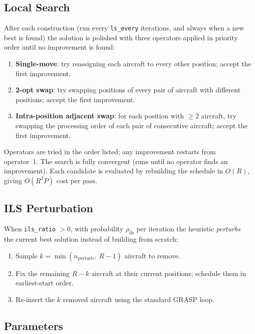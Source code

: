 \subsection{Local Search}
\label{sec:constructive-ls}

After each construction (run every \texttt{ls\_every} iterations, and always
when a new best is found) the solution is polished with three operators applied
in priority order until no improvement is found:

\begin{enumerate}[noitemsep]
    \item \textbf{Single-move}: try reassigning each aircraft to every other
          position; accept the first improvement.
    \item \textbf{2-opt swap}: try swapping positions of every pair of aircraft
          with different positions; accept the first improvement.
    \item \textbf{Intra-position adjacent swap}: for each position with
          $\geq 2$ aircraft, try swapping the processing order of each pair of
          consecutive aircraft; accept the first improvement.
\end{enumerate}

Operators are tried in the order listed; any improvement restarts from
operator~1.  The search is fully convergent (runs until no operator finds an
improvement).  Each candidate is evaluated by rebuilding the schedule in
$O(R)$, giving $O(R^2 P)$ cost per pass.

\subsection{ILS Perturbation}

When \texttt{ils\_ratio} $> 0$, with probability $\rho_{\text{ils}}$ per
iteration the heuristic \emph{perturbs} the current best solution instead of
building from scratch:

\begin{enumerate}[noitemsep]
    \item Sample $k = \min(n_{\text{perturb}},\; R-1)$ aircraft to remove.
    \item Fix the remaining $R - k$ aircraft at their current positions;
          schedule them in earliest-start order.
    \item Re-insert the $k$ removed aircraft using the standard GRASP loop.
\end{enumerate}

\subsection{Parameters}

